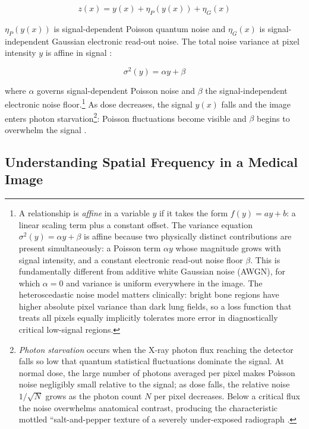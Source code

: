 \documentclass[12pt, a4paper, twoside, openright]{book}
\begin{document}
\begin{equation}
\label{eq:intro:noise}
z(x) = y(x) + \eta_P(y(x)) + \eta_G(x)
\end{equation}

$\eta_P(y(x))$ is signal-dependent Poisson quantum noise and $\eta_G(x)$ is signal-independent Gaussian electronic read-out noise. The total noise variance at pixel intensity $y$ is affine in signal \cite{foi_practical_2008, borges_noise_2020}:

\begin{equation}
\label{eq:intro:variance}
\sigma^2(y) = \alpha y + \beta
\end{equation}

where $\alpha$ governs signal-dependent Poisson noise and $\beta$ the signal-independent electronic noise floor.\footnote{A relationship is \emph{affine} in a variable $y$ if it takes the form $f(y) = ay + b$: a linear scaling term plus a constant offset. The variance equation $\sigma^2(y) = \alpha y + \beta$ is affine because two physically distinct contributions are present simultaneously: a Poisson term $\alpha y$ whose magnitude grows with signal intensity, and a constant electronic read-out noise floor $\beta$. This is fundamentally different from additive white Gaussian noise (AWGN), for which $\alpha = 0$ and variance is uniform everywhere in the image. The heteroscedastic noise model matters clinically: bright bone regions have higher absolute pixel variance than dark lung fields, so a loss function that treats all pixels equally implicitly tolerates more error in diagnostically critical low-signal regions.} As dose decreases, the signal $y(x)$ falls and the image enters photon starvation\footnote{\emph{Photon starvation} occurs when the X-ray photon flux reaching the detector falls so low that quantum statistical fluctuations dominate the signal. At normal dose, the large number of photons averaged per pixel makes Poisson noise negligibly small relative to the signal; as dose falls, the relative noise $1/\sqrt{N}$ grows as the photon count $N$ per pixel decreases. Below a critical flux the noise overwhelms anatomical contrast, producing the characteristic mottled ``salt-and-pepper texture of a severely under-exposed radiograph \cite{borges_noise_2020}.}: Poisson fluctuations become visible and $\beta$ begins to overwhelm the signal \cite{foi_practical_2008}.

\subsection{Understanding Spatial Frequency in a Medical Image}
\label{sec:intro:tradeoff:frequency}
\end{document}
